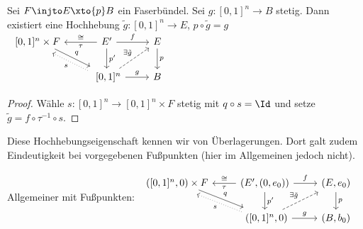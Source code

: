 
\begin{kor}
    Sei $F \injto E \xto{p} B$ ein Faserbündel.
    Sei $g: [0,1]^n \to B$ stetig.
    Dann existiert eine Hochhebung $\tilde g: [0,1]^n \to E$, $p \circ \tilde g = g$
    \begin{math}
        \begin{tikzcd}~
            [0,1]^n \times F \ar[rd,"q",shift left] & E' \ar[l,"\tau","\homeomorphic"'] \ar[r,"f"] \ar[d,"p'"] & E \ar[d,"p"] \\
            &~[0,1]^n \ar[r,"g"] \ar[ru,"\exists \tilde g",dashed] \ar[ul,"s",dotted,shift left] & B
        \end{tikzcd}
    \end{math}
    \begin{proof}
        Wähle $s: [0,1]^n \to [0,1]^n \times F$ stetig mit $q \circ s = \id$ und setze $\tilde g = f \circ \tau^{-1} \circ s$.
    \end{proof}
    \begin{note}
        Diese Hochhebungseigenschaft kennen wir von Überlagerungen.
        Dort galt zudem Eindeutigkeit bei vorgegebenen Fußpunkten (hier im Allgemeinen jedoch nicht).

        Allgemeiner mit Fußpunkten:
        \begin{math}
            \begin{tikzcd}~
                ([0,1]^n,0) \times F \ar[rd,"q",shift left] & (E',(0,e_0)) \ar[l,"\tau","\homeomorphic"'] \ar[r,"f"] \ar[d,"p'"] & (E,e_0) \ar[d,"p"] \\
                &~([0,1]^n,0) \ar[r,"g"] \ar[ru,"\exists \tilde g",dashed] \ar[ul,"s",dotted,shift left] & (B,b_0)
            \end{tikzcd}
        \end{math}
    \end{note}
\end{kor}

